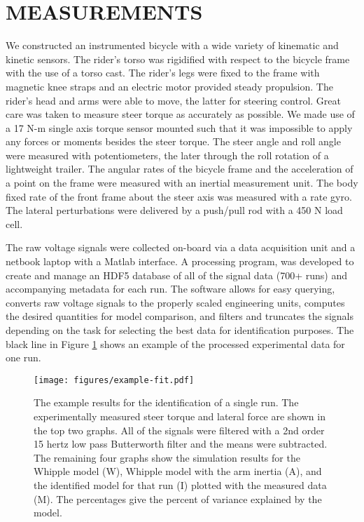 \documentclass[twocolumn,10pt]{asme2e}
\begin{document}
\section*{MEASUREMENTS}
We constructed an instrumented bicycle with a wide variety of kinematic and
kinetic sensors. The rider's torso was rigidified with respect to the bicycle
frame with the use of a torso cast. The rider's legs were fixed to the frame
with magnetic knee straps and an electric motor provided steady propulsion. The
rider's head and arms were able to move, the latter for steering control. Great
care was taken to measure steer torque as accurately as possible. We made use
of a 17 N-m single axis torque sensor mounted such that it was impossible to
apply any forces or moments besides the steer torque. The steer angle and roll
angle were measured with potentiometers, the later through the roll rotation of
a lightweight trailer. The angular rates of the bicycle frame and the
acceleration of a point on the frame were measured with an inertial measurement
unit. The body fixed rate of the front frame about the steer axis was measured
with a rate gyro. The lateral perturbations were delivered by a push/pull rod
with a 450 N load cell.

The raw voltage signals were collected on-board via a data acquisition unit and
a netbook laptop with a Matlab interface. A processing program, was developed
to create and manage an HDF5 database of all of the signal data (700+ runs) and
accompanying metadata for each run. The software allows for easy querying,
converts raw voltage signals to the properly scaled engineering units, computes
the desired quantities for model comparison, and filters and truncates the
signals depending on the task for selecting the best data for identification
purposes. The black line in Figure \ref{fig:exampleFit} shows an example of
the processed experimental data for one run.

\begin{figure}
	\texttt{[image: figures/example-fit.pdf]}
	\caption{The example results for the identification of a single run. The
	experimentally measured steer torque and lateral force are shown in the top
	two graphs. All of the signals were filtered with a 2nd order 15 hertz low
	pass Butterworth filter and the means were subtracted. The remaining four
	graphs show the simulation results for the Whipple model (W), Whipple model
	with the arm inertia (A), and the identified model for that run (I) plotted
	with the measured data (M). The percentages give the percent of variance
	explained by the model.}
	\label{fig:exampleFit}
\end{figure}
\end{document}
